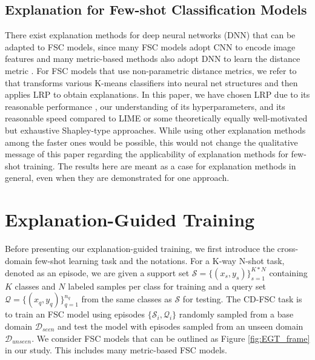 \documentclass[a4paper,conference]{IEEEtran}
\begin{document}
\subsection{Explanation for Few-shot Classification Models}
There exist explanation methods for deep neural networks (DNN) \cite{LRP:bach2015pixel, DEEPTAYLOR:Lmontavon2017explaining, GRADIENT:simonyan2013deep, GuidebackPropagation:springenberg2014striving, GRADCAM:selvaraju2017grad, GNNLRP:schnake2020xai} that can be adapted to FSC models, since many FSC models adopt CNN to encode image features and many metric-based methods also adopt DNN to learn the distance metric \cite{RN:sung2018learning, FEWGNN:garcia2018fewshot, TPN:liu2018learning}. For FSC models that use non-parametric distance metrics, we refer to \cite{Explainkmeans:kauffmann2019clustering} that transforms various K-means classifiers into neural net structures and then applies LRP to obtain explanations. 
In this paper, we have chosen LRP due to its reasonable performance \cite{COMPARISON:poerner2018evaluating}, our understanding of its hyperparameters, and its reasonable speed compared to LIME or some theoretically equally well-motivated but exhaustive Shapley-type approaches. While using other explanation methods among the faster ones would be possible, this would not change the qualitative message of this paper regarding the applicability of explanation methods for few-shot training. The results here are meant as a case for explanation methods in general, even when they are demonstrated for one approach. 

\section{Explanation-Guided Training}
\label{sec:EGT}
Before presenting our explanation-guided training, we first introduce the cross-domain few-shot learning task and the notations.
For a K-way N-shot task, denoted as an episode, we are given a support set $\mathcal{S}=\{(x_s, y_s)\}^{K*N}_{s=1}$ containing $K$ classes and $N$ labeled samples per class for training and a query set $\mathcal{Q}=\{(x_q, y_q)\}_{q=1}^{n_q}$ from the same classes as $\mathcal{S}$ for testing. The CD-FSC task is to train an FSC model using episodes $\{\mathcal{S}_i, \mathcal{Q}_i\}$ randomly sampled from a base domain $\mathcal{D}_{seen}$ and test the model with episodes sampled from an unseen domain $\mathcal{D}_{unseen}$.
We consider FSC models that can be outlined as Figure \ref{fig:EGT_frame} in our study. This includes many metric-based FSC models. 
\end{document}
